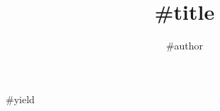 \documentclass[a4paper,11pt]{article}
\title{#{title}}
\author{#{author}}
\begin{document}
\maketitle

#{yield}
\end{document}
